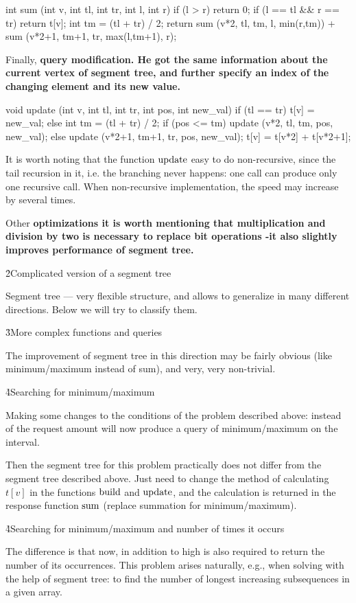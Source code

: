 \code
int sum (int v, int tl, int tr, int l, int r) {
if (l > r)
return 0;
if (l == tl && r == tr)
return t[v];
int tm = (tl + tr) / 2;
return sum (v*2, tl, tm, l, min(r,tm))
+ sum (v*2+1, tm+1, tr, max(l,tm+1), r);
}
\endcode

Finally, \bf{query modification}. He got the same information about the current vertex of segment tree, and further specify an index of the changing element and its new value.

\code
void update (int v, int tl, int tr, int pos, int new_val) {
if (tl == tr)
t[v] = new_val;
else {
int tm = (tl + tr) / 2;
if (pos <= tm)
update (v*2, tl, tm, pos, new_val);
else
update (v*2+1, tm+1, tr, pos, new_val);
t[v] = t[v*2] + t[v*2+1];
}
}
\endcode

It is worth noting that the function $\rm update$ easy to do non-recursive, since the tail recursion in it, i.e. the branching never happens: one call can produce only one recursive call. When non-recursive implementation, the speed may increase by several times.

Other \bf{optimizations} it is worth mentioning that multiplication and division by two is necessary to replace bit operations -it also slightly improves performance of segment tree.


\h2{Complicated version of a segment tree}

Segment tree --- very flexible structure, and allows to generalize in many different directions. Below we will try to classify them.


\h3{More complex functions and queries}

The improvement of segment tree in this direction may be fairly obvious (like minimum/maximum instead of sum), and very, very non-trivial.

\h4{Searching for minimum/maximum}

Making some changes to the conditions of the problem described above: instead of the request amount will now produce a query of minimum/maximum on the interval.

Then the segment tree for this problem practically does not differ from the segment tree described above. Just need to change the method of calculating $t[v]$ in the functions $\rm build$ and $\rm update$, and the calculation is returned in the response function $\rm sum$ (replace summation for minimum/maximum).

\h4{Searching for minimum/maximum and number of times it occurs}

The difference is that now, in addition to high is also required to return the number of its occurrences. This problem arises naturally, e.g., when solving with the help of segment tree: to find the number of longest increasing subsequences in a given array.


